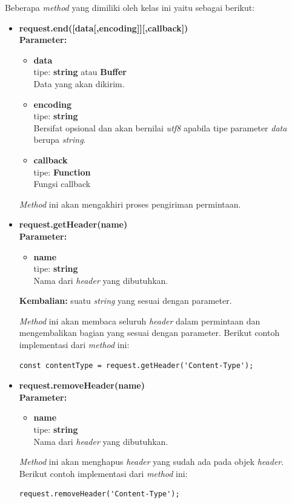 \documentclass[a4paper,twoside]{article}
\begin{document}
\begin{enumerate}
\begin{enumerate}
\begin{itemize}
				Beberapa \textit{method} yang dimiliki oleh kelas ini yaitu sebagai berikut:
				\begin{itemize}
					\item \textbf{request.end([data[,encoding]][,callback])} \\ 
					\textbf{Parameter:} 
					\begin{itemize}
						\item \textbf{data} \\tipe: \textbf{string} atau \textbf{Buffer} \\ Data yang akan dikirim.
						\item \textbf{encoding} \\tipe: \textbf{string} \\ Bersifat opsional dan akan bernilai \textit{utf8} apabila tipe parameter \textit{data} berupa \textit{string}.
						\item \textbf{callback} \\tipe:	\textbf{Function} \\ Fungsi callback
					\end{itemize}
					
					\textit{Method} ini akan mengakhiri proses pengiriman permintaan.
					
					\item \textbf{request.getHeader(name)} \\
					\textbf{Parameter:} 
					\begin{itemize}
						\item \textbf{name} \\tipe: \textbf{string} \\ Nama dari \textit{header} yang dibutuhkan.
					\end{itemize}
					\textbf{Kembalian:} suatu \textit{string} yang sesuai dengan parameter.
					
					\textit{Method} ini akan membaca seluruh \textit{header} dalam permintaan dan mengembalikan bagian yang sesuai dengan parameter. Berikut contoh implementasi dari \textit{method} ini:
\begin{lstlisting}
const contentType = request.getHeader('Content-Type');
\end{lstlisting}
					
					\item \textbf{request.removeHeader(name)} \\ 
					\textbf{Parameter:}
					\begin{itemize}
						\item \textbf{name} \\tipe: \textbf{string} \\ Nama dari \textit{header} yang dibutuhkan.
					\end{itemize}
					\textit{Method} ini akan menghapus \textit{header} yang sudah ada pada objek \textit{header}. Berikut contoh implementasi dari \textit{method} ini:
\begin{lstlisting}
request.removeHeader('Content-Type');
\end{lstlisting}
					

\end{itemize}
\end{itemize}
\end{enumerate}
\end{enumerate}
\end{document}
